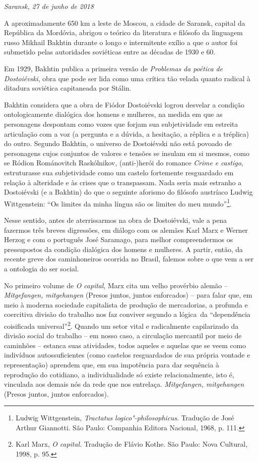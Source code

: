 \begin{flushright}
\emph{Saransk, 27 de junho de 2018}
\end{flushright}

A aproximadamente 650 km a leste de Moscou, a cidade de Saransk, capital
da República da Mordóvia, abrigou o teórico da literatura e filósofo da
linguagem russo Mikhail Bakhtin durante o longo e intermitente exílio a
que o autor foi submetido pelas autoridades soviéticas entre as décadas
de 1930 e 60.

Em 1929, Bakhtin publica a primeira versão de \emph{Problemas da poética
de Dostoiévski}, obra que pode ser lida como uma crítica tão velada
quanto radical à ditadura soviética capitaneada por Stálin. %

Bakhtin considera que a obra de Fiódor Dostoiévski logrou desvelar a
condição ontologicamente dialógica dos homens e mulheres, na medida em
que as personagens despontam como vozes que forjam sua subjetividade em
estreita articulação com a voz (a pergunta e a dúvida, a hesitação, a
réplica e a tréplica) do outro. Segundo Bakhtin, o universo de
Dostoiévski não está povoado de personagens cujos conjuntos de valores e
tensões se insulam em si mesmos, como se Ródion Románovitch Raskólnikov,
(anti-)herói do romance \emph{Crime e castigo}, estruturasse sua
subjetividade como um castelo fortemente resguardado em relação à
alteridade e às crises que o transpassam. Nada seria mais estranho a
Dostoiévski (e a Bakhtin) do que o seguinte aforismo do filósofo
austríaco Ludwig Wittgenstein: ``Os limites da minha língua são os
limites do meu mundo''\footnote{Ludwig Wittgenstein, \emph{Tractatus
  logico"-philosophicus}. Tradução de José Arthur Giannotti. São Paulo:
  Companhia Editora Nacional, 1968, p. 111.}.

Nesse sentido, antes de aterrissarmos na obra de Dostoiévski, vale a
pena fazermos três breves digressões, em diálogo com os alemães Karl
Marx e Werner Herzog e com o português José Saramago, para melhor
compreendermos os pressupostos da condição dialógica dos homens e
mulheres. A partir, então, da recente greve dos caminhoneiros ocorrida
no Brasil, falemos sobre o que vem a ser a ontologia do ser social.

No primeiro volume de \emph{O capital}, Marx cita um velho provérbio
alemão --\emph{Mitgefangen, mitgehangen} (Presos juntos, juntos
enforcados) -- para falar que, em meio à moderna sociedade capitalista
de produção de mercadorias, a profunda e coercitiva divisão do trabalho
nos faz conviver segundo a lógica~da ``dependência coisificada
universal''\footnote{Karl Marx, \emph{O capital.} Tradução de Flávio
  Kothe. São Paulo: Nova Cultural, 1998, p. 95.}. Quando um setor vital
e radicalmente capilarizado da divisão social do trabalho -- em nosso
caso, a circulação mercantil por meio de caminhões -- estanca suas
atividades, todos aqueles e aquelas que se veem como indivíduos
autossuficientes (como castelos resguardados de sua própria vontade e
representação) aprendem que, em sua impotência para dar sequência à
reprodução do cotidiano, a individualidade só existe relacionalmente,
isto é, vinculada aos demais nós da rede que nos entrelaça.
\emph{Mitgefangen, mitgehangen} (Presos juntos, juntos enforcados).

